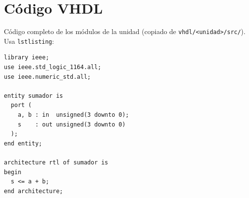 \documentclass[llncs]{llncs}
\begin{document}



\appendix
\section{Código VHDL}
\label{app:codigo}

Código completo de los módulos de la unidad (copiado de
\texttt{vhdl/<unidad>/src/}). Usa \texttt{lstlisting}:

\begin{lstlisting}[caption={sumador.vhd --- <descripción>}, label=lst:sumador]
library ieee;
use ieee.std_logic_1164.all;
use ieee.numeric_std.all;

entity sumador is
  port (
    a, b : in  unsigned(3 downto 0);
    s    : out unsigned(3 downto 0)
  );
end entity;

architecture rtl of sumador is
begin
  s <= a + b;
end architecture;
\end{lstlisting}
\end{document}
